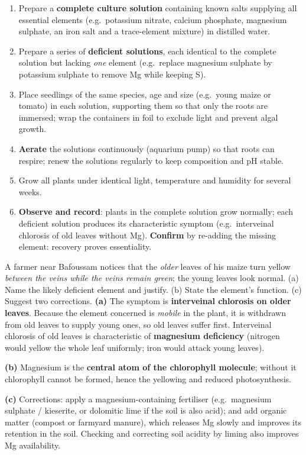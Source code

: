 \documentclass[11pt]{article}
\begin{document}
\begin{methode}
\begin{enumerate}
\item Prepare a \textbf{complete culture solution} containing known salts supplying all essential elements (e.g.\ potassium nitrate, calcium phosphate, magnesium sulphate, an iron salt and a trace-element mixture) in distilled water.
\item Prepare a series of \textbf{deficient solutions}, each identical to the complete solution but lacking \emph{one} element (e.g.\ replace magnesium sulphate by potassium sulphate to remove Mg while keeping S).
\item Place seedlings of the same species, age and size (e.g.\ young maize or tomato) in each solution, supporting them so that only the roots are immersed; wrap the containers in foil to exclude light and prevent algal growth.
\item \textbf{Aerate} the solutions continuously (aquarium pump) so that roots can respire; renew the solutions regularly to keep composition and pH stable.
\item Grow all plants under identical light, temperature and humidity for several weeks.
\item \textbf{Observe and record}: plants in the complete solution grow normally; each deficient solution produces its characteristic symptom (e.g.\ interveinal chlorosis of old leaves without Mg). \textbf{Confirm} by re-adding the missing element: recovery proves essentiality.
\end{enumerate}
\end{methode}

\begin{exoresolu}
A farmer near Bafoussam notices that the \emph{older} leaves of his maize turn yellow \emph{between the veins while the veins remain green}; the young leaves look normal. (a) Name the likely deficient element and justify. (b) State the element's function. (c) Suggest two corrections.
\tcblower
\textbf{(a)} The symptom is \textbf{interveinal chlorosis on older leaves}. Because the element concerned is \emph{mobile} in the plant, it is withdrawn from old leaves to supply young ones, so old leaves suffer first. Interveinal chlorosis of old leaves is characteristic of \textbf{magnesium deficiency} (nitrogen would yellow the whole leaf uniformly; iron would attack young leaves).

\textbf{(b)} Magnesium is the \textbf{central atom of the chlorophyll molecule}; without it chlorophyll cannot be formed, hence the yellowing and reduced photosynthesis.

\textbf{(c)} Corrections: apply a magnesium-containing fertiliser (e.g.\ magnesium sulphate / kieserite, or dolomitic lime if the soil is also acid); and add organic matter (compost or farmyard manure), which releases Mg slowly and improves its retention in the soil. Checking and correcting soil acidity by liming also improves Mg availability.
\end{exoresolu}
\end{document}
